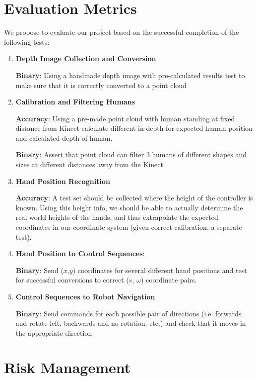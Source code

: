 \documentclass[a4paper]{article}
\begin{document}
\section{Evaluation Metrics}
We propose to evaluate our project based on the successful completion of the following tests:

\begin{enumerate}
\item \textbf{Depth Image Collection and Conversion}

\textbf{Binary}: Using a handmade depth image with pre-calculated results test to make sure that it is correctly converted to a point cloud

\item \textbf{Calibration and Filtering Humans}

\textbf{Accuracy}: Using a pre-made point cloud with human standing at fixed distance from Kinect calculate different in depth for expected human position and calculated depth of human.

\textbf{Binary}: Assert that point cloud can filter 3 humans of different shapes and sizes at different distances away from the Kinect.

\item \textbf{Hand Position Recognition}

\textbf{Accuracy}: A test set should be collected where the height of the controller is known. Using this height info, we should be able to actually determine the real world heights of the hands, and thus extrapolate the expected coordinates in our coordinate system (given correct calibration, a separate test).

\item \textbf{Hand Position to Control Sequences}: 

\textbf{Binary}: Send ($x$,$y$) coordinates for several different hand positions and test for successful conversions to correct ($v$, $\omega$) coordinate pairs.

\item \textbf{Control Sequences to Robot Navigation}

\textbf{Binary}: Send commands for each possible pair of directions (i.e. forwards and rotate left, backwards and no rotation, etc.) and check that it moves in the appropriate direction
\end{enumerate}

\section{Risk Management}
\end{document}
